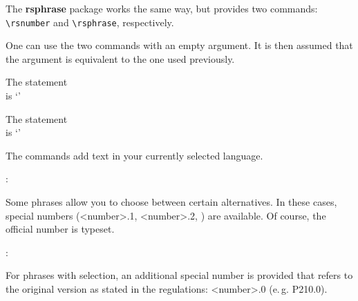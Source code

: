 \documentclass[a4paper,notitlepage]{scrreprt}
\begin{document}
\noindent The \textbf{rsphrase} package works the same way, but provides two
commands: \verb|\rsnumber| and \verb|\rsphrase|, respectively.

\bigskip

\noindent One can use the two commands with an empty argument. It is then
assumed that the argument is equivalent to the one used previously. \bigskip

\begin{addmargin}[1em]{0em}
\begin{SideBySideExample}[xrightmargin=7cm]
  The statement \\
  is `\hpstatement{}'
\end{SideBySideExample}
\end{addmargin}
\bigskip

\begin{addmargin}[1em]{0em}
\begin{SideBySideExample}[xrightmargin=7cm]
  The statement \\
  is `\hpstatement{}'
\end{SideBySideExample}
\end{addmargin}
\bigskip

\noindent The commands add text in your currently selected language.
\bigskip

\begin{addmargin}[1em]{0em}
\begin{SideBySideExample}[xrightmargin=7cm]
  :
  \hpstatement{}
\end{SideBySideExample}
\end{addmargin}
\bigskip

\noindent Some phrases allow you to choose between certain alternatives. In
these cases, special numbers (<number>.1, <number>.2, \textellipsis) are
available. Of course, the official number is typeset. \bigskip

\begin{addmargin}[1em]{0em}
\begin{SideBySideExample}[xrightmargin=7cm]
  :
  \hpstatement{}
\end{SideBySideExample}
\end{addmargin}
\bigskip

\noindent For phrases with selection, an additional special number is provided
that refers to the original version as stated in the regulations: <number>.0
(e.\,g. P210.0).
\bigskip
\end{document}
